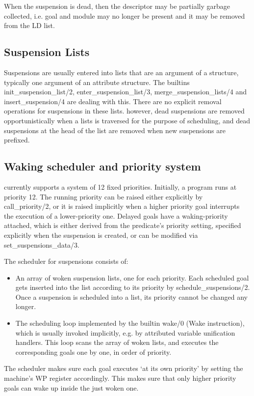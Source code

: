 When the suspension is dead, then the descriptor may be partially
garbage collected, i.e. goal and module may no longer be present and
it may be removed from the LD list.


\subsection{Suspension Lists}
Suspensions are usually entered into lists that are an argument of a structure,
typically one argument of an attribute structure.
The builtins
init_suspension_list/2,
enter_suspension_list/3,
merge_suspension_lists/4
and 
insert_suspension/4
are dealing with this. There are no explicit removal operations for suspensions
in these lists. however, dead suspensions are removed opportunistically
when a lists is traversed for the purpose of scheduling, and dead
suspensions at the head of the list are removed when new suspensions are
prefixed.


\subsection{Waking scheduler and priority system}
\label{chappriority}

{\eclipse} currently supports a system of 12 fixed priorities.
Initially, a program runs at priority  12. The running priority can be raised
either explicitly by call_priority/2, or it is raised implicitly when
a higher priority goal interrupts the execution of a lower-priority one.
Delayed goals have a waking-priority attached, which is either derived
from the predicate's priority setting, specified explicitly when the
suspension is created, or can be modified via set_suspensions_data/3.

The scheduler for suspensions consists of:
\begin{itemize}
\item An array of woken suspension lists, one for each priority.  Each
        scheduled goal gets inserted into the list according to its
        priority by schedule_suspensions/2.
        Once a suspension is scheduled into a list, its
        priority cannot be changed any longer.

\item The scheduling loop implemented by the builtin wake/0 (Wake instruction),
        which is usually invoked implicitly, e.g. by
        attributed variable unification handlers.  This loop scans the
        array of woken lists, and executes the corresponding goals one
        by one, in order of priority.
\end{itemize}
The scheduler makes sure each goal executes `at its own priority' by setting
the machine's WP  register accordingly. This makes sure that only higher
priority goals can wake up inside the just woken one.

